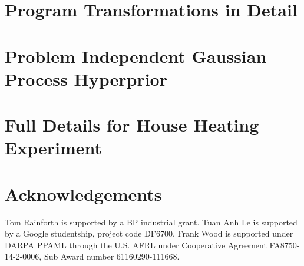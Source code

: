 \documentclass[]{article}
\begin{document}


\newpage

\appendix

\section{Program Transformations in Detail}
\label{sec:program-transformations}



\section{Problem Independent Gaussian Process Hyperprior}
\label{sec:app:hyperprior}



\section{Full Details for House Heating Experiment}
\label{sec:app:heating}



\newpage

\section*{Acknowledgements}
Tom Rainforth is supported by a BP industrial grant. Tuan Anh Le is supported by a Google studentship, project code DF6700.  Frank Wood is supported under DARPA PPAML through the U.S. AFRL under Cooperative Agreement FA8750-14-2-0006, Sub Award number 61160290-111668.

{}
\end{document}
